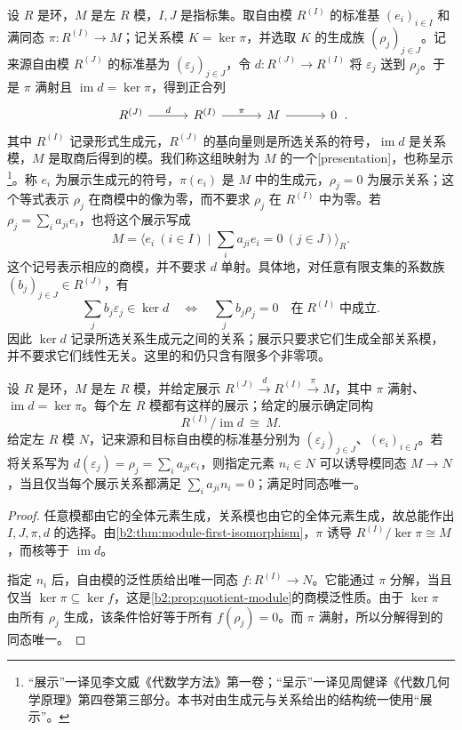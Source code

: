 \begin{definition}\label{b2:def:module-presentation}
	设 \(R\) 是环，\(M\) 是左 \(R\) 模，\(I,J\) 是指标集。取自由模 \(R^{(I)}\) 的标准基 \((e_i)_{i\in I}\) 和满同态 \(\pi:R^{(I)}\to M\)；记关系模 \(K=\ker\pi\)，并选取 \(K\) 的生成族 \((\rho_j)_{j\in J}\)。记来源自由模 \(R^{(J)}\) 的标准基为 \((\varepsilon_j)_{j\in J}\)，令 \(d:R^{(J)}\to R^{(I)}\) 将 \(\varepsilon_j\) 送到 \(\rho_j\)。于是 \(\pi\) 满射且 \(\operatorname{im}d=\ker\pi\)，得到正合列
	\[
		\begin{tikzcd}[column sep=3.2em]
			R^{(J)} \arrow[r,"d"] & R^{(I)} \arrow[r,"\pi"] & M \arrow[r] & 0
		\end{tikzcd}\,.
	\]
	其中 \(R^{(I)}\) 记录形式生成元，\(R^{(J)}\) 的基向量则是所选关系的符号，\(\operatorname{im}d\) 是关系模，\(M\) 是取商后得到的模。我们称这组映射为 \(M\) 的一个[presentation]，也称呈示\footnote{“展示”一译见李文威《代数学方法》第一卷\cite[第 4.8 节“群展示”]{Li2018AlgebraMethodsI}；“呈示”一译见周健译《代数几何学原理》第四卷第三部分\cite[第 4 章第 8.5 节“有限呈示模层”]{GrothendieckZhou2024EGAIV3}。本书对由生成元与关系给出的结构统一使用“展示”。}。称 \(e_i\) 为展示生成元的符号，\(\pi(e_i)\) 是 \(M\) 中的生成元，\(\rho_j=0\) 为展示关系；这个等式表示 \(\rho_j\) 在商模中的像为零，而不要求 \(\rho_j\) 在 \(R^{(I)}\) 中为零。若 \(\rho_j=\sum_i a_{ji}e_i\)，也将这个展示写成
	\[
		M=\langle e_i\ (i\in I)\mid \textstyle\sum_i a_{ji}e_i=0\ (j\in J)\rangle_R.
	\]
	这个记号表示相应的商模，并不要求 \(d\) 单射。具体地，对任意有限支集的系数族 \((b_j)_{j\in J}\in R^{(J)}\)，有
	\[
		\sum_j b_j\varepsilon_j\in\ker d \quad\Longleftrightarrow\quad \sum_j b_j\rho_j=0\quad\text{在}\;R^{(I)}\;\text{中成立}.
	\]
	因此 \(\ker d\) 记录所选关系生成元之间的关系；展示只要求它们生成全部关系模，并不要求它们线性无关。这里的和仍只含有限多个非零项。
\end{definition}

\begin{proposition}\label{b2:prop:module-presentation}
	设 \(R\) 是环，\(M\) 是左 \(R\) 模，并给定展示 \(R^{(J)}\xrightarrow{d}R^{(I)}\xrightarrow{\pi}M\)，其中 \(\pi\) 满射、\(\operatorname{im}d=\ker\pi\)。每个左 \(R\) 模都有这样的展示；给定的展示确定同构
	\[
		R^{(I)}/\operatorname{im}d\ \cong\ M.
	\]
	给定左 \(R\) 模 \(N\)，记来源和目标自由模的标准基分别为 \((\varepsilon_j)_{j\in J}\)、\((e_i)_{i\in I}\)。若将关系写为 \(d(\varepsilon_j)=\rho_j=\sum_i a_{ji}e_i\)，则指定元素 \(n_i\in N\) 可以诱导模同态 \(M\to N\)，当且仅当每个展示关系都满足 \(\sum_i a_{ji}n_i=0\)；满足时同态唯一。
\end{proposition}
\begin{proof}
	任意模都由它的全体元素生成，关系模也由它的全体元素生成，故总能作出 \(I,J,\pi,d\) 的选择。由\cref{b2:thm:module-first-isomorphism}，\(\pi\) 诱导 \(R^{(I)}/\ker\pi\cong M\)，而核等于 \(\operatorname{im}d\)。

	指定 \(n_i\) 后，自由模的泛性质给出唯一同态 \(f:R^{(I)}\to N\)。它能通过 \(\pi\) 分解，当且仅当 \(\ker\pi\subseteq\ker f\)，这是\cref{b2:prop:quotient-module}的商模泛性质。由于 \(\ker\pi\) 由所有 \(\rho_j\) 生成，该条件恰好等于所有 \(f(\rho_j)=0\)。而 \(\pi\) 满射，所以分解得到的同态唯一。
\end{proof}

